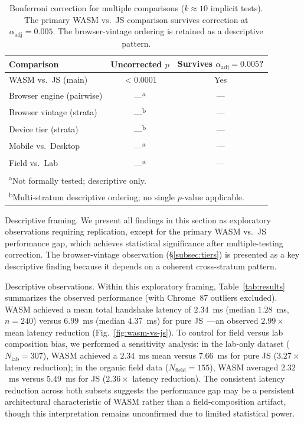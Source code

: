 \documentclass[11pt,a4paper]{article}
\def\textbf#1{#1}%
\begin{document}
\begin{table}[htbp]
\centering
\caption{Bonferroni correction for multiple comparisons ($k \approx 10$ implicit tests). \textbf{The primary WASM vs.\ JS comparison survives correction at $\alpha_{\text{adj}} = 0.005$.} The browser-vintage ordering is retained as a descriptive pattern.}
\label{tab:bonferroni}
\begin{tabular}{@{}lcc@{}}
\toprule
\textbf{Comparison} & \textbf{Uncorrected $p$} & \textbf{Survives $\alpha_{\text{adj}} = 0.005$?} \\
\midrule
WASM vs.\ JS (main) & $<0.0001$ & Yes \\
Browser engine (pairwise) & ---\textsuperscript{a} & --- \\
Browser vintage (strata) & ---\textsuperscript{b} & --- \\
Device tier (strata) & ---\textsuperscript{b} & --- \\
Mobile vs.\ Desktop & ---\textsuperscript{a} & --- \\
Field vs.\ Lab & ---\textsuperscript{a} & --- \\
\bottomrule
\multicolumn{3}{l}{\textsuperscript{a}\footnotesize{Not formally tested; descriptive only.}} \\
\multicolumn{3}{l}{\textsuperscript{b}\footnotesize{Multi-stratum descriptive ordering; no single $p$-value applicable.}} \\
\end{tabular}
\end{table}

\textbf{Descriptive framing.} We present all findings in this section as exploratory observations requiring replication, except for the primary WASM vs.\ JS performance gap, which achieves statistical significance after multiple-testing correction. The browser-vintage observation (\S\ref{subsec:tiers}) is presented as a key descriptive finding because it depends on a coherent cross-stratum pattern.

\textbf{Descriptive observations.} Within this exploratory framing, Table~\ref{tab:results} summarizes the observed performance (with Chrome~87 outliers excluded). WASM achieved a mean total handshake latency of $2.34$~ms (median $1.28$~ms, $n=240$) versus $6.99$~ms (median $4.37$~ms) for pure JS~\cite{noble-post-quantum}---an observed $2.99\times$ mean latency reduction (Fig.~\ref{fig:wasm-vs-js}). To control for field versus lab composition bias, we performed a sensitivity analysis: in the lab-only dataset ($N_{\text{lab}}=307$), WASM achieved a $2.34$~ms mean versus $7.66$~ms for pure JS ($3.27\times$ latency reduction); in the organic field data ($N_{\text{field}}=155$), WASM averaged $2.32$~ms versus $5.49$~ms for JS ($2.36\times$ latency reduction). The consistent latency reduction across both subsets suggests the performance gap may be a persistent architectural characteristic of WASM rather than a field-composition artifact, though this interpretation remains unconfirmed due to limited statistical power.
\end{document}
